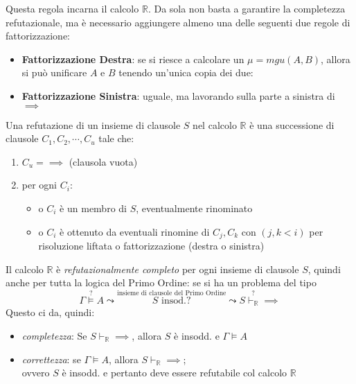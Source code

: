Questa regola incarna il calcolo $\mathbb{R}$. Da sola non basta a garantire la completezza 
refutazionale, ma è necessario aggiungere almeno una delle seguenti due 
regole di fattorizzazione: 
\begin{itemize}
  \item \textbf{Fattorizzazione Destra}: se si riesce a calcolare un $\mu = mgu(A,B)$, allora si può unificare $A$ e $B$ tenendo un'unica copia dei due:
    \begin{prooftree}
    \end{prooftree}
  \item \textbf{Fattorizzazione Sinistra}: uguale, ma lavorando sulla parte a sinistra di $\implies$
    \begin{prooftree}
    \end{prooftree}
\end{itemize}

Una refutazione di un insieme di clausole $S$ nel calcolo $\mathbb{R}$ è una successione di clausole $C_1, C_2, \cdots, C_u$ tale che: 
\begin{enumerate}
  \item $C_u = \implies$ (clausola vuota)
  \item per ogni $C_i$:
    \begin{itemize}
      \item o $C_i$ è un membro di $S$, eventualmente rinominato
      \item o $C_i$ è ottenuto da eventuali rinomine di $C_j, C_k$ con $(j,k < i)$ per risoluzione liftata o fattorizzazione (destra o sinistra)
    \end{itemize}
\end{enumerate}
Il calcolo $\mathbb{R}$ è \textit{refutazionalmente completo} per ogni insieme di clausole $S$, quindi anche per tutta la logica del Primo Ordine: se si ha un problema del tipo
$$
\Gamma \stackrel{?}{\models} A \leadsto \stackrel {\text{insieme di clausole del Primo Ordine}} {S \text{ insod.?}} \leadsto S \stackrel ? {\vdash_\mathbb{R}} \implies
$$
Questo ci da, quindi:
\begin{itemize}
  \item \textit{completezza}: Se $S \vdash_\mathbb{R} \implies$, allora $S$ è insodd. e $\Gamma \models A$
  \item \textit{correttezza}: se $\Gamma \models A$, allora $S \vdash_\mathbb{R} \implies$; \\
  ovvero $S$ è insodd. e pertanto deve essere refutabile col calcolo $\mathbb{R}$
\end{itemize} 


